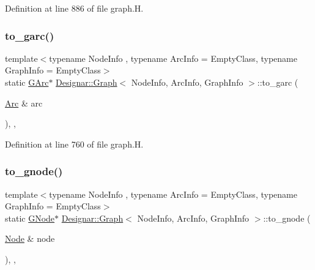 Definition at line 886 of file graph.\+H.

\mbox{\label{class_designar_1_1_graph_ab79eb63dd332e483db77da69c1b04522}} 
\subsubsection{\texorpdfstring{to\+\_\+garc()}{to\_garc()}}
{\footnotesize\ttfamily template$<$typename Node\+Info , typename Arc\+Info  = Empty\+Class, typename Graph\+Info  = Empty\+Class$>$ \\
static \hyperlink{class_designar_1_1_graph_a5ad9e18b71899c2d4979426e367e5573}{G\+Arc}$\ast$ \hyperlink{class_designar_1_1_graph}{Designar\+::\+Graph}$<$ Node\+Info, Arc\+Info, Graph\+Info $>$\+::to\+\_\+garc (\begin{DoxyParamCaption}\item[{\hyperlink{class_designar_1_1_graph_a74c730ef4ce2d20f998d72bd25c2b5bf}{Arc} \&}]{arc }\end{DoxyParamCaption})\hspace{0.3cm}{\ttfamily [inline]}, {\ttfamily [static]}, {\ttfamily [protected]}}



Definition at line 760 of file graph.\+H.

\mbox{\label{class_designar_1_1_graph_a23038b7502c6fdb53b23453b19579c0e}} 
\subsubsection{\texorpdfstring{to\+\_\+gnode()}{to\_gnode()}}
{\footnotesize\ttfamily template$<$typename Node\+Info , typename Arc\+Info  = Empty\+Class, typename Graph\+Info  = Empty\+Class$>$ \\
static \hyperlink{class_designar_1_1_graph_a7e61951db0bb9bfa8a2e317440d4e17f}{G\+Node}$\ast$ \hyperlink{class_designar_1_1_graph}{Designar\+::\+Graph}$<$ Node\+Info, Arc\+Info, Graph\+Info $>$\+::to\+\_\+gnode (\begin{DoxyParamCaption}\item[{\hyperlink{class_designar_1_1_graph_a5dfc7dba9d092ac489c72e40390c37d0}{Node} \&}]{node }\end{DoxyParamCaption})\hspace{0.3cm}{\ttfamily [inline]}, {\ttfamily [static]}, {\ttfamily [protected]}}



